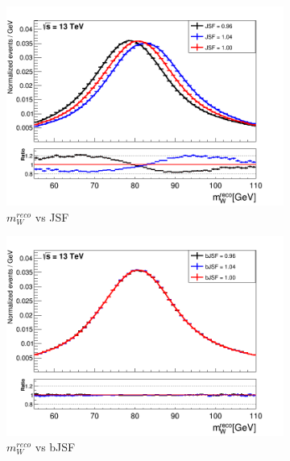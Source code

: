 \begin{landscape}
\begin{figure}
\begin{subfigure}{0.37\textwidth}
	\includegraphics[width=\linewidth]{Pics/PlotCombi/mw_JSF.png}
	\caption{$m_{W}^{reco}$ vs JSF} \label{fig:mwJSF}
	\end{subfigure}
	\hspace*{0.25cm}
	\begin{subfigure}{0.37\textwidth}
	\includegraphics[width=\linewidth]{Pics/PlotCombi/mw_bJSF.png}
	\caption{$m_{W}^{reco}$ vs bJSF} \label{fig:mwbJSF}
	\end{subfigure}
	\begin{subfigure}{0.37\textwidth}

\end{subfigure}
\end{figure}
\end{landscape}
